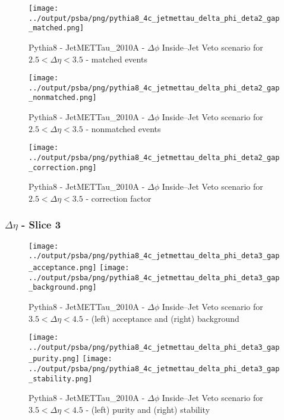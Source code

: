 \documentclass[11pt]{book}
\begin{document}
\begin{figure}[ht]
\centering
\texttt{[image: ../output/psba/png/pythia8\_4c\_jetmettau\_delta\_phi\_deta2\_gap\_matched.png]}
\caption{Pythia8 - JetMETTau\_2010A - $\Delta\phi$ Inside--Jet Veto scenario for $2.5 < \Delta\eta < 3.5$ - matched events}
\label{fig:p8_jetmettau_delta_phi_deta2_gap_matched}
\end{figure}

\begin{figure}[ht]
\centering
\texttt{[image: ../output/psba/png/pythia8\_4c\_jetmettau\_delta\_phi\_deta2\_gap\_nonmatched.png]}
\caption{Pythia8 - JetMETTau\_2010A - $\Delta\phi$ Inside--Jet Veto scenario for $2.5 < \Delta\eta < 3.5$ - nonmatched events}
\label{fig:p8_jetmettau_delta_phi_deta2_gap_nonmatched}
\end{figure}

\begin{figure}[ht]
\centering
\texttt{[image: ../output/psba/png/pythia8\_4c\_jetmettau\_delta\_phi\_deta2\_gap\_correction.png]}
\caption{Pythia8 - JetMETTau\_2010A - $\Delta\phi$ Inside--Jet Veto scenario for $2.5 < \Delta\eta < 3.5$ - correction factor}
\label{fig:p8_jetmettau_delta_phi_deta2_gap_correction}
\end{figure}

\clearpage
\subsubsection{$\Delta\eta$ - Slice 3}
\begin{figure}[ht]
\centering
\texttt{[image: ../output/psba/png/pythia8\_4c\_jetmettau\_delta\_phi\_deta3\_gap\_acceptance.png]}
\texttt{[image: ../output/psba/png/pythia8\_4c\_jetmettau\_delta\_phi\_deta3\_gap\_background.png]}
\caption{Pythia8 - JetMETTau\_2010A - $\Delta\phi$ Inside--Jet Veto scenario for $3.5 < \Delta\eta < 4.5$ - (left) acceptance and (right) background}
\label{fig:p8_jetmettau_delta_phi_deta3_gap_ab}
\end{figure}

\begin{figure}[ht]
\centering
\texttt{[image: ../output/psba/png/pythia8\_4c\_jetmettau\_delta\_phi\_deta3\_gap\_purity.png]}
\texttt{[image: ../output/psba/png/pythia8\_4c\_jetmettau\_delta\_phi\_deta3\_gap\_stability.png]}
\caption{Pythia8 - JetMETTau\_2010A - $\Delta\phi$ Inside--Jet Veto scenario for $3.5 < \Delta\eta < 4.5$ - (left) purity and (right) stability}
\label{fig:p8_jetmettau_delta_phi_deta3_gap_ps}
\end{figure}
\end{document}
